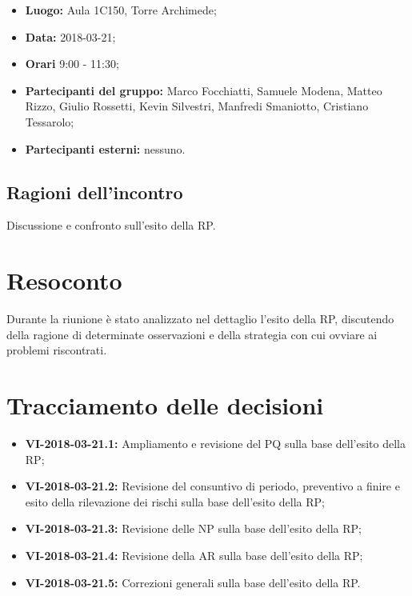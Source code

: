 \documentclass[openany,12pt,a4paper]{article}
\begin{document}
	\begin{itemize} 
	    \item \textbf{Luogo:} Aula 1C150, Torre Archimede;
	    \item \textbf{Data:} 2018-03-21;
	    \item \textbf{Orari} 9:00 - 11:30;
	    \item \textbf{Partecipanti del gruppo:} Marco Focchiatti, Samuele Modena, Matteo Rizzo, Giulio Rossetti, Kevin Silvestri, Manfredi Smaniotto, Cristiano Tessarolo;
	    \item \textbf{Partecipanti esterni:} nessuno.
	\end{itemize}
	
	\subsection{Ragioni dell'incontro}
	
	Discussione e confronto sull'esito della RP.

	\section{Resoconto}
	
	Durante la riunione è stato analizzato nel dettaglio l'esito della RP, discutendo della ragione di determinate osservazioni e della strategia con cui ovviare ai problemi riscontrati.  
	
	\section{Tracciamento delle decisioni}
	
	\begin{itemize}
	    \item \textbf{VI-2018-03-21.1:} Ampliamento e revisione del PQ sulla base dell'esito della RP;
	    \item \textbf{VI-2018-03-21.2:} Revisione del consuntivo di periodo, preventivo a finire e esito della rilevazione dei rischi sulla base dell'esito della RP;
	    \item \textbf{VI-2018-03-21.3:} Revisione delle NP sulla base dell'esito della RP;
	    \item \textbf{VI-2018-03-21.4:} Revisione della AR sulla base dell'esito della RP;
	    \item \textbf{VI-2018-03-21.5:} Correzioni generali sulla base dell'esito della RP.
	\end{itemize}	

	
\end{document}
